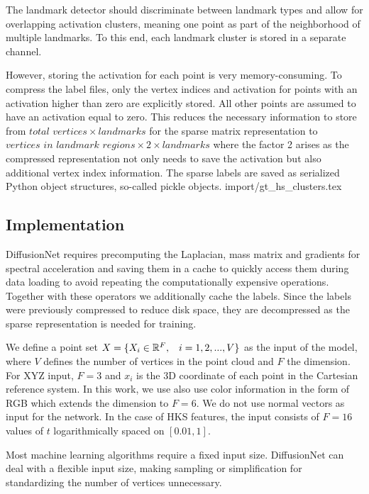 \documentclass[class=article, crop=false]{standalone}
\begin{document}
The landmark detector should discriminate between landmark types and allow for overlapping activation clusters, meaning one point as part of the neighborhood of multiple landmarks. To this end, each landmark cluster is stored in a separate channel.

However, storing the activation for each point is very memory-consuming. To compress the label files, only the vertex indices and activation for points with an activation higher than zero are explicitly stored. All other points are assumed to have an activation equal to zero. This reduces the necessary information to store from $\textit{total vertices} \times \textit{}{landmarks}$ for the sparse matrix representation to $\textit{vertices in landmark regions} \times \textit{2} \times \textit{landmarks}$ where the factor 2 arises as the compressed representation not only needs to save the activation but also additional vertex index information. The sparse labels are saved as serialized Python object structures, so-called pickle objects.
{import/gt_hs_clusters.tex}


\subsection{Implementation}
DiffusionNet requires precomputing the Laplacian, mass matrix and gradients for spectral acceleration and saving them in a cache to quickly access them during data loading to avoid repeating the computationally expensive operations. Together with these operators we additionally cache the labels. Since the labels were previously compressed to reduce disk space, they are decompressed as the sparse representation is needed for training.

We define a point set \begin{math}X=\{X_i \in \mathbb{R}^F,\hspace{0.3cm}i = 1,2,...,V\}\end{math} as the input of the model, where $V$ defines the number of vertices in the point cloud and $F$ the dimension. For XYZ input, $F=3$ and $x_i$ is the 3D coordinate of each point in the Cartesian reference system. In this work, we use also use color information in the form of RGB which extends the dimension to $F=6$. We do not use normal vectors as input for the network. In the case of HKS features, the input consists of $F=16$ values of $t$ logarithmically spaced on $[0.01, 1]$.

Most machine learning algorithms require a fixed input size. DiffusionNet can deal with a flexible input size, making sampling or simplification for standardizing the number of vertices unnecessary.
\end{document}
